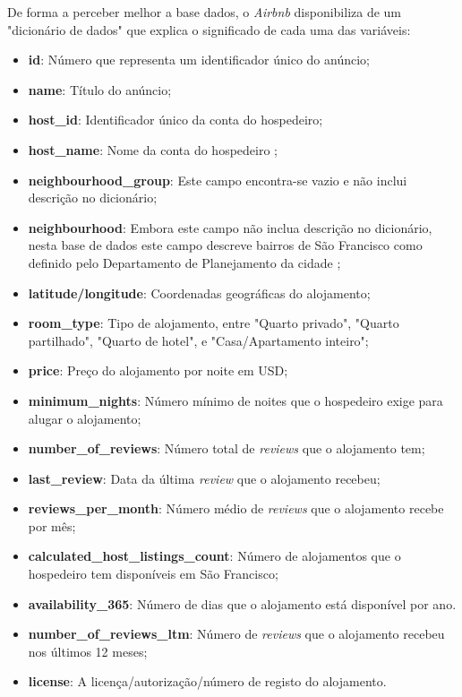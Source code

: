 \documentclass[a4paper, justified]{tufte-handout}\usepackage[]{graphicx}\usepackage[]{xcolor}
\begin{document}
De forma a perceber melhor a base dados, o \textit{Airbnb} disponibiliza de um "dicionário de dados"\cite{DicDadosAirBnb} que explica o significado de cada uma das variáveis:

\begin{itemize}
  \item \textbf{id}: Número que representa um identificador único do anúncio;
  \item \textbf{name}: Título do anúncio;
  \item \textbf{host\_id}: Identificador único da conta do hospedeiro;
  \item \textbf{host\_name}: Nome da conta do hospedeiro ;
  \item \textbf{neighbourhood\_group}: Este campo encontra-se vazio e não inclui descrição no dicionário;
  \item \textbf{neighbourhood}: Embora este campo não inclua descrição no dicionário, nesta base de dados este campo descreve bairros de São Francisco como definido pelo Departamento de Planejamento da cidade ;
  \item \textbf{latitude/longitude}: Coordenadas geográficas do alojamento;
  \item \textbf{room\_type}: Tipo de alojamento, entre "Quarto privado", "Quarto partilhado", "Quarto de hotel", e "Casa/Apartamento inteiro";
  \item \textbf{price}: Preço do alojamento por noite em USD;
  \item \textbf{minimum\_nights}: Número mínimo de noites que o hospedeiro exige para alugar o alojamento;
  \item \textbf{number\_of\_reviews}: Número total de \textit{reviews} que o alojamento tem;
  \item \textbf{last\_review}: Data da última \textit{review} que o alojamento recebeu;
  \item \textbf{reviews\_per\_month}: Número médio de \textit{reviews} que o alojamento recebe por mês;
  \item \textbf{calculated\_host\_listings\_count}: Número de alojamentos que o hospedeiro tem disponíveis em São Francisco;
  \item \textbf{availability\_365}: Número de dias que o alojamento está disponível por ano.
  \item \textbf{number\_of\_reviews\_ltm}: Número de \textit{reviews} que o alojamento recebeu nos últimos 12 meses;
  \item \textbf{license}: A licença/autorização/número de registo do alojamento.
\end{itemize}
\end{document}
